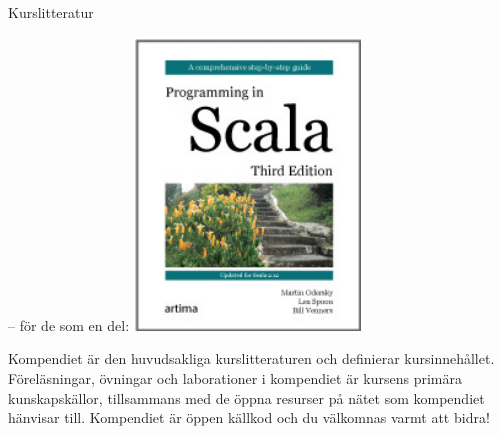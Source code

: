 \begin{Slide}{Kurslitteratur}
\begin{minipage}{0.5\textwidth}
\noindent -- för de som  en del:
\vskip0.7mm
\includegraphics[width=0.45\textwidth]{../img/pinsbook.jpg}\hskip4mm
\end{minipage}
\end{Slide}

\ifkompendium
\noindent Kompendiet är den huvudsakliga kurslitteraturen och definierar kursinnehållet. Föreläsningar, övningar och laborationer i kompendiet är kursens primära kunskapskällor, tillsammans med de öppna resurser på nätet som kompendiet hänvisar till. Kompendiet är öppen källkod och du välkomnas varmt att bidra!

